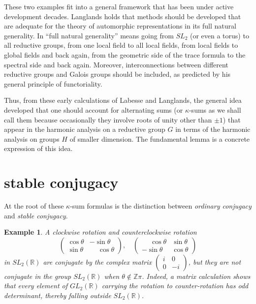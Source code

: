 \documentclass[brochure,english,12pt]{bourbaki}
\newtheorem{example}[equation]{Example}
\newcommand{\ring}[1]{\mathbb{#1}}
\begin{document}
These two examples fit into a general framework that has been under
active development decades.  Langlands holds that methods should be
developed that are adequate for the theory of automorphic
representations in its full natural generality.  In ``full natural
generality'' means going from $SL_2$ (or even a torus) to all
reductive groups, from one local field to all local fields, from local
fields to global fields and back again, from the geometric side of the
trace formula to the spectral side and back again.  Moreover,
interconnections between different reductive groups and Galois groups
should be included, as predicted by his general principle of
functoriality.


Thus, from these early calculations of Labesse and Langlands, the
general idea developed that one should account for alternating sums
(or $\kappa$-sums as we shall call them because occasionally they
involve roots of unity other than $\pm1$) that appear in the harmonic
analysis on a reductive group $G$ in terms of the harmonic analysis on
groups $H$ of smaller dimension.  The fundamental lemma is a concrete
expression of this idea.


\section{stable conjugacy}

At the root of these $\kappa$-sum formulas is the distinction between
{\it ordinary conjugacy} and {\it stable conjugacy}.  
\begin{example}
A clockwise rotation and counterclockwise rotation
\[
\begin{pmatrix}\cos\theta &-\sin\theta\\\sin\theta &\phantom{-}\cos\theta\end{pmatrix},\quad
\begin{pmatrix}\phantom{-}\cos\theta &\sin\theta\\-\sin\theta &\cos\theta\end{pmatrix}
\]
in $SL_2(\ring{R})$ are conjugate by the complex matrix $\begin{pmatrix}i&0\\0&-i\end{pmatrix}$, 
but they are not conjugate
in the group $SL_2(\ring{R})$ when $\theta\not\in\ring{Z}\pi$.  Indeed,
a matrix calculation shows
that every element of $GL_2(\ring{R})$ carrying the rotation to
counter-rotation has odd determinant, thereby falling outside $SL_2(\ring{R})$.
\end{example}
\end{document}

